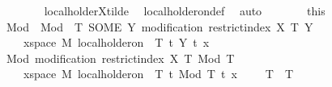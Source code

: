 \begin{isabellebody}
\ \ \ \ \ \ \isamarkupfalse%
\ local{\isacharunderscore}{\kern0pt}holder{\isacharunderscore}{\kern0pt}X{\isacharunderscore}{\kern0pt}tilde\ \isamarkupfalse%
\ local{\isacharunderscore}{\kern0pt}holder{\isacharunderscore}{\kern0pt}on{\isacharunderscore}{\kern0pt}def\ \isamarkupfalse%
\ auto\isanewline
\ \ \isacommand{{\isacharbraceright}{\kern0pt}}\isamarkupfalse%
\ \isamarkupfalse%
\ {\isacharasterisk}{\kern0pt}\ {\isacharequal}{\kern0pt}\ this\isanewline
\ \ \isamarkupfalse%
\ Mod\ \ {\isachardoublequoteopen}Mod\ {\isasymequiv}\ {\isasymlambda}T{\isachardot}{\kern0pt}\ SOME\ Y{\isachardot}{\kern0pt}\ modification\ {\isacharparenleft}{\kern0pt}restrict{\isacharunderscore}{\kern0pt}index\ X\ {\isacharbraceleft}{\kern0pt}{}{\isachardot}{\kern0pt}{\isachardot}{\kern0pt}T{\isacharbraceright}{\kern0pt}{\isacharparenright}{\kern0pt}\ Y\ {\isasymand}\ \isanewline
\ \ \ \ {\isacharparenleft}{\kern0pt}{\isasymforall}x{\isasymin}space\ {\isacharquery}{\kern0pt}M{\isachardot}{\kern0pt}\ local{\isacharunderscore}{\kern0pt}holder{\isacharunderscore}{\kern0pt}on\ {\isasymgamma}\ {\isacharbraceleft}{\kern0pt}{}{\isachardot}{\kern0pt}{\isachardot}{\kern0pt}T{\isacharbraceright}{\kern0pt}\ {\isacharparenleft}{\kern0pt}{\isasymlambda}t{\isachardot}{\kern0pt}\ Y\ t\ x{\isacharparenright}{\kern0pt}{\isacharparenright}{\kern0pt}{\isachardoublequoteclose}\isanewline
\ \ \isamarkupfalse%
\ Mod{\isacharcolon}{\kern0pt}\ {\isachardoublequoteopen}modification\ {\isacharparenleft}{\kern0pt}restrict{\isacharunderscore}{\kern0pt}index\ X\ {\isacharbraceleft}{\kern0pt}{}{\isachardot}{\kern0pt}{\isachardot}{\kern0pt}T{\isacharbraceright}{\kern0pt}{\isacharparenright}{\kern0pt}\ {\isacharparenleft}{\kern0pt}Mod\ T{\isacharparenright}{\kern0pt}{\isachardoublequoteclose}\isanewline
\ \ \ \ {\isachardoublequoteopen}{\isacharparenleft}{\kern0pt}{\isasymforall}x{\isasymin}space\ {\isacharquery}{\kern0pt}M{\isachardot}{\kern0pt}\ local{\isacharunderscore}{\kern0pt}holder{\isacharunderscore}{\kern0pt}on\ {\isasymgamma}\ {\isacharbraceleft}{\kern0pt}{}{\isachardot}{\kern0pt}{\isachardot}{\kern0pt}T{\isacharbraceright}{\kern0pt}\ {\isacharparenleft}{\kern0pt}{\isasymlambda}t{\isachardot}{\kern0pt}\ {\isacharparenleft}{\kern0pt}Mod\ T{\isacharparenright}{\kern0pt}\ t\ x{\isacharparenright}{\kern0pt}{\isacharparenright}{\kern0pt}\ {\isachardoublequoteclose}\ \ {\isachardoublequoteopen}{}\ {\isacharless}{\kern0pt}\ T{\isachardoublequoteclose}\ \ T\isanewline

\end{isabellebody}
